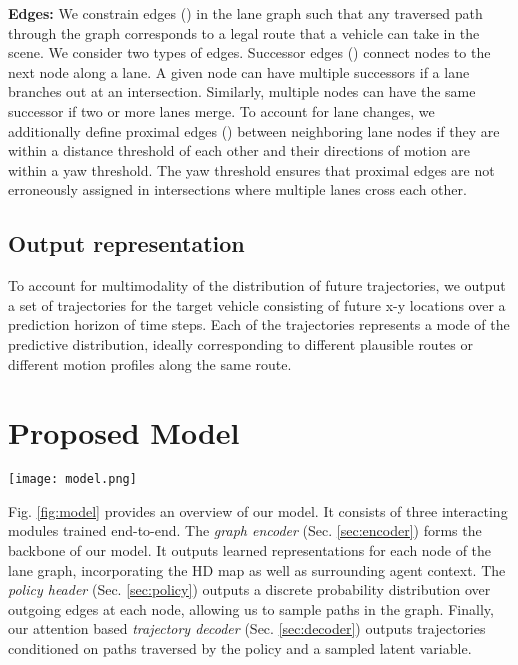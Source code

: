 \documentclass{article}
\begin{document}
\textbf{Edges:} We constrain edges () in the lane graph such that any traversed path through the graph corresponds to a legal route that a vehicle can take in the scene. We consider two types of edges. Successor edges () connect nodes to the next node along a lane. A given node can have multiple successors if a lane branches out at an intersection. Similarly, multiple nodes can have the same successor if two or more lanes merge. To account for lane changes, we additionally define proximal edges () between neighboring lane nodes if they are within a distance threshold of each other and their directions of motion are within a yaw threshold. The yaw threshold ensures that proximal edges are not erroneously assigned in intersections where multiple lanes cross each other. 

\vspace{-2mm}
\subsection{Output representation}

To account for multimodality of the distribution of future trajectories, we output a set of  trajectories  for the target vehicle consisting of future x-y locations over a prediction horizon of  time steps. Each of the  trajectories represents a mode of the predictive distribution, ideally corresponding to different plausible routes or different motion profiles along the same route. 

\vspace{-2mm}

\section{Proposed Model}
\label{sec:model}

\begin{figure*}[t]
\centering
\texttt{[image: model.png]}
\caption{\textbf{Proposed model.} PGP consists of three modules trained end-to-end. The graph encoder (top) encodes agent and map context as node encodings of a directed lane-graph. The policy header (bottom-left) learns a discrete policy for sampled graph traversals. The trajectory decoder (bottom-right) predicts trajectories by selectively attending to node encodings along paths traversed by the policy and a sampled latent variable. }
\label{fig:model}
\end{figure*}

Fig. \ref{fig:model} provides an overview of our model. It consists of three interacting modules trained end-to-end.
The \textit{graph encoder} (Sec. \ref{sec:encoder}) forms the backbone of our model. It outputs learned representations for each node of the lane graph, incorporating the HD map as well as surrounding agent context.
The \textit{policy header} (Sec. \ref{sec:policy}) outputs a discrete probability distribution over outgoing edges at each node, allowing us to sample paths in the graph. Finally, our attention based \textit{trajectory decoder} (Sec. \ref{sec:decoder}) outputs trajectories conditioned on paths traversed by the policy and a sampled latent variable.
\end{document}
